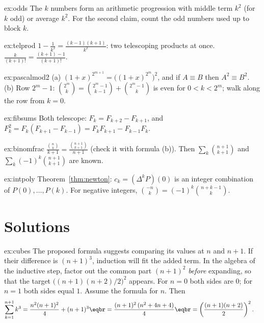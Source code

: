 \begin{hint}{ex:odds}
The $k$ numbers form an arithmetic progression with middle term $k^2$ (for $k$ odd) or average $k^2$. For the second claim, count the odd numbers used up to block $k$.
\end{hint}
\begin{hint}{ex:telprod}
$1-\frac1{k^2}=\frac{(k-1)(k+1)}{k^2}$: two telescoping products at once. $\frac k{(k+1)!}=\frac{(k+1)-1}{(k+1)!}$.
\end{hint}
\begin{hint}{ex:pascalmod2}
(a) $(1+x)^{2^{m+1}}=\bigl((1+x)^{2^m}\bigr)^2$, and if $A\equiv B$ then $A^2\equiv B^2$. (b) Row $2^m-1$: $\binom{2^m}k=\binom{2^m-1}{k-1}+\binom{2^m-1}k$ is even for $0<k<2^m$; walk along the row from $k=0$.
\end{hint}
\begin{hint}{ex:fibsums}
Both telescope: $F_k=F_{k+2}-F_{k+1}$, and $F_k^2=F_k(F_{k+1}-F_{k-1})=F_kF_{k+1}-F_{k-1}F_k$.
\end{hint}
\begin{hint}{ex:binomfrac}
$\frac{\binom nk}{k+1}=\frac{\binom{n+1}{k+1}}{n+1}$ (check it with formula (b)). Then $\sum_k\binom{n+1}{k+1}$ and $\sum_k(-1)^k\binom{n+1}{k+1}$ are known.
\end{hint}
\begin{hint}{ex:intpoly}
Theorem~\ref{thm:newton}: $c_k=(\Delta^kP)(0)$ is an integer combination of $P(0),\dots,P(k)$. For negative integers, $\binom{-n}k=(-1)^k\binom{n+k-1}k$.
\end{hint}


\section{Solutions}

\begin{solution}{ex:cubes}
\idea The proposed formula suggests comparing its values at $n$ and $n+1$. If their difference is $(n+1)^3$, induction will fit the added term. In the algebra of the inductive step, factor out the common part $(n+1)^2$ \emph{before} expanding, so that the target $\bigl((n+1)(n+2)/2\bigr)^2$ appears.
\writeup For $n=0$ both sides are $0$; for $n=1$ both sides equal $1$. Assume the formula for $n$. Then
\[
\begin{aligned}\sum_{k=1}^{n+1}k^3&=\frac{n^2(n+1)^2}4+(n+1)^3\eqbr=\frac{(n+1)^2\,(n^2+4n+4)}4\eqbr=\left(\frac{(n+1)(n+2)}2\right)^2.\end{aligned}
\]
\end{solution}

